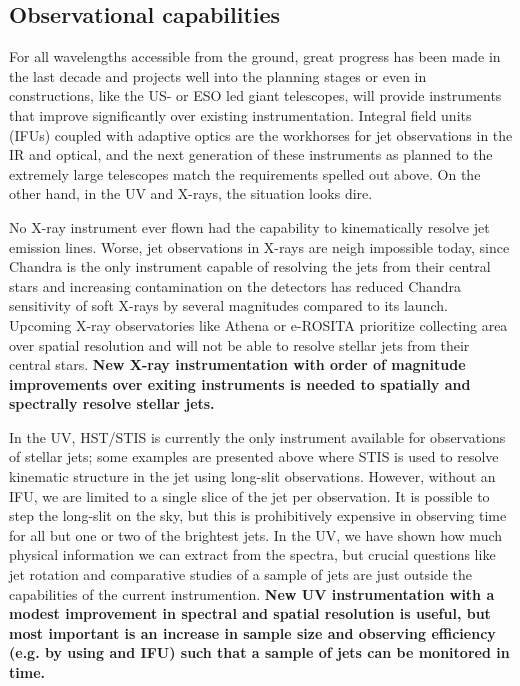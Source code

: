 \documentclass[12pt]{article}
\begin{document}
\subsection{Observational capabilities}
For all wavelengths accessible from the ground, great progress has been made in the last decade and projects well into the planning stages or even in constructions, like the US- or ESO led giant telescopes, will provide instruments that improve significantly over existing instrumentation. Integral field units (IFUs) coupled with adaptive optics are the workhorses for jet observations in the IR and optical, and the next generation of these instruments as planned to the extremely large telescopes match the requirements spelled out above. On the other hand, in the UV and X-rays, the situation looks dire. 

No X-ray instrument ever flown had the capability to kinematically resolve jet emission lines. Worse, jet observations in X-rays are neigh impossible today, since Chandra is the only instrument capable of resolving the jets from their central stars and increasing contamination on the detectors has reduced Chandra sensitivity of soft X-rays by several magnitudes compared to its launch. Upcoming X-ray observatories like Athena or e-ROSITA prioritize collecting area over spatial resolution and will not be able to resolve stellar jets from their central stars. \textbf{New X-ray instrumentation with order of magnitude improvements over exiting instruments is needed to spatially and spectrally resolve stellar jets.}

In the UV, HST/STIS is currently the only instrument available for observations of stellar jets; some examples are presented above where STIS is used to resolve kinematic structure in the jet using long-slit observations. However, without an IFU, we are limited to a single slice of the jet per observation. It is possible to step the long-slit on the sky, but this is prohibitively expensive in observing time for all but one or two of the brightest jets. In the UV, we have shown how much physical information we can extract from the spectra, but crucial questions like jet rotation and comparative studies of a sample of jets are just outside the capabilities of the current instrumention. \textbf{New UV instrumentation with a modest improvement in spectral and spatial resolution is useful, but most important is an increase in sample size and observing efficiency (e.g. by using and IFU) such that a sample of jets can be monitored in time. }
\end{document}
